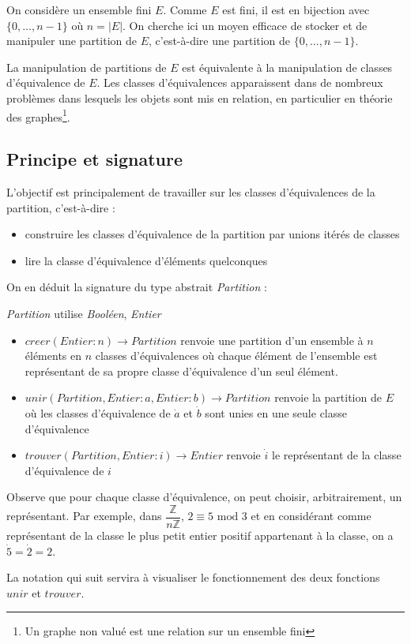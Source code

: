 \documentclass[../../../main.tex]{subfiles}
\begin{document}
On considère un ensemble fini $E$. Comme $E$ est fini, il est en bijection avec $\{0, \dots, n - 1\}$ où $n = |E|$. On cherche ici un moyen efficace de stocker et de manipuler une partition de $E$, c'est-à-dire une partition de $\{0, \dots, n-1\}$.

La manipulation de partitions de $E$ est équivalente à la manipulation de classes d'équivalence de $E$. Les classes d'équivalences apparaissent dans de nombreux problèmes dans lesquels les objets sont mis en relation, en particulier en théorie des graphes\footnote{Un graphe non valué est une relation sur un ensemble fini}.
\subsection{Principe et signature}
L'objectif est principalement de travailler sur les classes d'équivalences de la partition, c'est-à-dire :
\begin{itemize}
	\item construire les classes d'équivalence de la partition par unions itérés de classes
	\item lire la classe d'équivalence d'éléments quelconques
\end{itemize}
On en déduit la signature du type abstrait \textit{Partition} :

\textit{Partition} utilise \textit{Booléen}, \textit{Entier}
\begin{itemize}
	\item $creer(Entier:n)\rightarrow Partition$ renvoie une partition d'un ensemble à $n$ éléments en $n$ classes d'équivalences où chaque élément de l'ensemble est représentant de sa propre classe d'équivalence d'un seul élément.
	\item $unir(Partition, Entier:a, Entier:b)\rightarrow Partition$ renvoie la partition de $E$ où les classes d'équivalence de $\dot{a}$ et $\dot{b}$ sont unies en une seule classe d'équivalence
	\item $trouver(Partition, Entier:i)\rightarrow Entier$ renvoie $\dot{i}$ le représentant de la classe d'équivalence de $i$
\end{itemize}
Observe que pour chaque classe d'équivalence, on peut choisir, arbitrairement, un représentant. Par exemple, dans $\dfrac{\mathbb{Z}}{n\mathbb{Z}}$, $2\equiv 5\text{ mod }3$ et en considérant comme représentant de la classe le plus petit entier positif appartenant à la classe, on a $\dot{5} = \dot{2} = 2$.

La notation qui suit servira à visualiser le fonctionnement des deux fonctions $unir$ et $trouver$.
\end{document}
